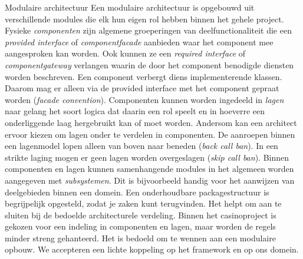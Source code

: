 \begin{defbox}{Modulaire architectuur}
    Een modulaire architectuur is opgebouwd uit verschillende modules
    die elk hun eigen rol hebben binnen het gehele project.
    \newline\newline
    Fysieke \emph{componenten} zijn algemene groeperingen van deelfunctionaliteit
    die een \emph{provided interface} of \emph{componentfacade} aanbieden
    waar het component mee aangesproken kan worden. Ook kunnen ze 
    een \emph{required interface} of \emph{componentgateway} verlangen
    waarin de door het component benodigde diensten worden beschreven.
    Een component verbergt diens implementerende klassen. Daarom mag 
    er alleen via de provided interface met het component gepraat worden (\emph{facade convention}).
    \newline\newline
    Componenten kunnen worden ingedeeld in \emph{lagen} naar gelang het 
    soort logica dat daarin een rol speelt en in hoeverre een 
    onderliggende laag hergebruikt kan of moet worden. 
    Andersom kan een architect ervoor kiezen om lagen onder te verdelen in componenten.
    De aanroepen binnen een lagenmodel lopen alleen van boven naar beneden (\emph{back call ban}). 
    In een strikte laging mogen er geen lagen worden overgeslagen (\emph{skip call ban}). 
    \newline\newline
    Binnen componenten en lagen kunnen samenhangende modules in het algemeen worden
    aangegeven met \emph{subsystemen}. Dit is bijvoorbeeld handig voor het aanwijzen 
    van deelgebieden binnen een domein.
    \newline\newline
    Een onderhoudbare packagestructuur is begrijpelijk opgesteld, zodat je zaken kunt 
    terugvinden. Het helpt om aan te sluiten bij de bedoelde architecturele verdeling.
    \newline\newline
    Binnen het casinoproject is gekozen voor een indeling in componenten en lagen, 
    maar worden de regels minder streng gehanteerd. Het is bedoeld om te wennen 
    aan een modulaire opbouw. We accepteren een lichte koppeling op het framework en op ons domein.
\end{defbox}